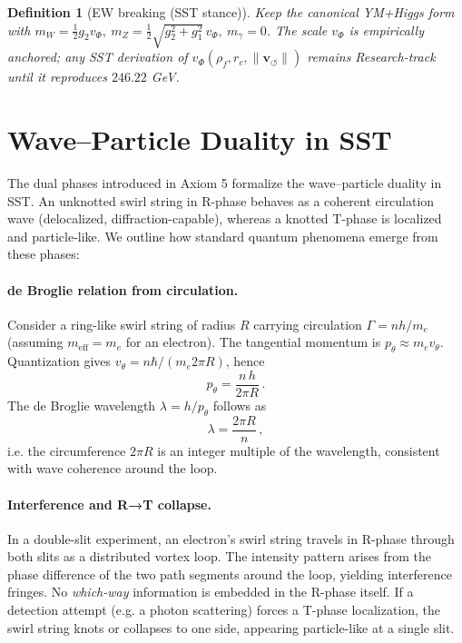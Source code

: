 \documentclass[11pt]{article}
\newtheorem{definition}{Definition}[section]
\begin{document}
\begin{definition}[EW breaking (SST stance)]
	Keep the canonical YM+Higgs form with $m_W=\tfrac{1}{2}g_2v_\Phi,\
	m_Z=\tfrac{1}{2}\sqrt{g_2^2+g_1^2}\,v_\Phi,\ m_\gamma=0$.
	The scale $v_\Phi$ is empirically anchored; any SST derivation of
	$v_\Phi(\rho_f,r_c,\|\mathbf{v}_{\!\boldsymbol{\circlearrowleft}}\|)$ remains Research-track until it reproduces $246.22$ GeV.
\end{definition}

\section{Wave–Particle Duality in SST}
\label{sec:wave_particle_duality}
The dual phases introduced in Axiom 5 formalize the wave–particle duality in SST. An unknotted swirl string in R-phase behaves as a coherent circulation wave (delocalized, diffraction-capable), whereas a knotted T-phase is localized and particle-like. We outline how standard quantum phenomena emerge from these phases:

\paragraph{de Broglie relation from circulation.}
    Consider a ring-like swirl string of radius $R$ carrying circulation $\Gamma = n h/m_e$ (assuming $m_{\text{eff}}=m_e$ for an electron). The tangential momentum is $p_\theta \approx m_e v_\theta$. Quantization gives $v_\theta = n \hbar/(m_e 2\pi R)$, hence
    \[
        p_\theta = \frac{n\,h}{2\pi R}\,.
    \]
    The de Broglie wavelength $\lambda = h/p_\theta$ follows as
    \[
        \lambda = \frac{2\pi R}{n}\,,
    \]
    i.e. the circumference $2\pi R$ is an integer multiple of the wavelength, consistent with wave coherence around the loop.

\paragraph{Interference and R→T collapse.}
    In a double-slit experiment, an electron's swirl string travels in R-phase through both slits as a distributed vortex loop. The intensity pattern arises from the phase difference of the two path segments around the loop, yielding interference fringes. No \emph{which-way} information is embedded in the R-phase itself. If a detection attempt (e.g. a photon scattering) forces a T-phase localization, the swirl string knots or collapses to one side, appearing particle-like at a single slit.
\end{document}
